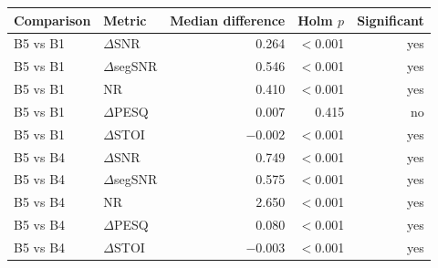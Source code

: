 \begin{tabular}{llrrr}
\toprule
Comparison & Metric & Median difference & Holm $p$ & Significant \\
\midrule
B5 vs B1 & $\Delta$SNR & 0.264 & $<$0.001 & yes \\
B5 vs B1 & $\Delta$segSNR & 0.546 & $<$0.001 & yes \\
B5 vs B1 & NR & 0.410 & $<$0.001 & yes \\
B5 vs B1 & $\Delta$PESQ & 0.007 & 0.415 & no \\
B5 vs B1 & $\Delta$STOI & $-$0.002 & $<$0.001 & yes \\
B5 vs B4 & $\Delta$SNR & 0.749 & $<$0.001 & yes \\
B5 vs B4 & $\Delta$segSNR & 0.575 & $<$0.001 & yes \\
B5 vs B4 & NR & 2.650 & $<$0.001 & yes \\
B5 vs B4 & $\Delta$PESQ & 0.080 & $<$0.001 & yes \\
B5 vs B4 & $\Delta$STOI & $-$0.003 & $<$0.001 & yes \\
\bottomrule
\end{tabular}
